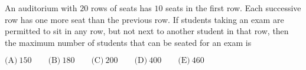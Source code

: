 

An auditorium with $20$ rows of seats has $10$ seats in the first row. Each successive row has one more seat than the previous row. If students taking an exam are permitted to sit in any row, but not next to another student in that row, then the maximum number of students that can be seated for an exam is

$\text{(A)}\ 150 \qquad \text{(B)}\ 180 \qquad \text{(C)}\ 200 \qquad \text{(D)}\ 400 \qquad \text{(E)}\ 460$
